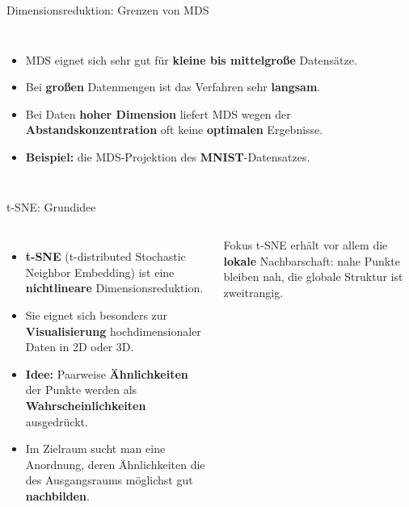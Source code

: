 \begin{frame}{Dimensionsreduktion: Grenzen von MDS}
\begin{columns}
\begin{itemize}
  \item MDS eignet sich sehr gut für \textbf{kleine bis mittelgroße}
        Datensätze.
  \item Bei \textbf{großen} Datenmengen ist das Verfahren sehr
        \textbf{langsam}.
  \item Bei Daten \textbf{hoher Dimension} liefert MDS wegen der
        \textbf{Abstandskonzentration} oft keine \textbf{optimalen} Ergebnisse.
  \item \textbf{Beispiel:} die MDS-Projektion des \textbf{MNIST}-Datensatzes.
\end{itemize}

\centering

\end{columns}
\end{frame}

\makequestionspage{\FRAGENIMAGE}



\begin{frame}{t-SNE: Grundidee}
\begin{columns}
\begin{itemize}
  \item \textbf{t-SNE} (t-distributed Stochastic Neighbor Embedding) ist
        eine \textbf{nichtlineare} Dimensionsreduktion.
  \item Sie eignet sich besonders zur \textbf{Visualisierung}
        hochdimensionaler Daten in 2D oder 3D.
  \item \textbf{Idee:} Paarweise \textbf{Ähnlichkeiten} der Punkte werden als
        \textbf{Wahrscheinlichkeiten} ausgedrückt.
  \item Im Zielraum sucht man eine Anordnung, deren Ähnlichkeiten die des
        Ausgangsraums möglichst gut \textbf{nachbilden}.
\end{itemize}

\begin{block}{Fokus}
t-SNE erhält vor allem die \textbf{lokale} Nachbarschaft: nahe Punkte
bleiben nah, die globale Struktur ist zweitrangig.
\end{block}
\end{columns}
\end{frame}


